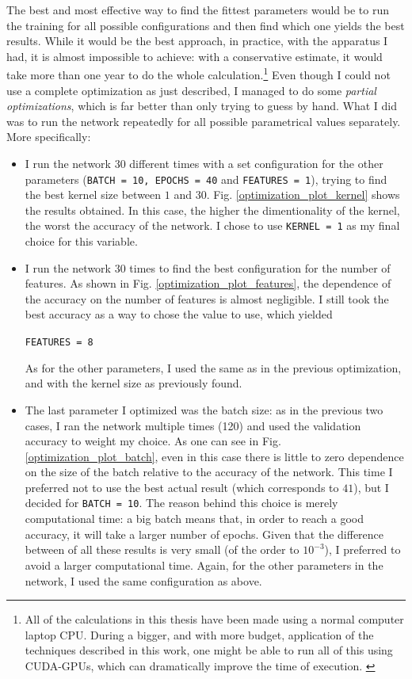 \documentclass[12pt,a4paper,final]{book}			%
\begin{document}
					The best and most effective way to find the fittest parameters would be to run the training for all possible configurations and then find which one yields the best results. While it would be the best approach, in practice, with the apparatus I had, it is almost impossible to achieve: with a conservative estimate, it would take more than one year to do the whole calculation.\footnote{All of the calculations in this thesis have been made using a normal computer laptop CPU. During a bigger, and with more budget, application of the techniques described in this work, one might be able to run all of this using CUDA-GPUs, which can dramatically improve the time of execution. \cite{cuda-gpu}}
					Even though I could not use a complete optimization as just described, I managed to do some \textit{partial optimizations}, which is far better than only trying to guess by hand. What I did was to run the network repeatedly for all possible parametrical values separately. More specifically:
					\begin{itemize}
						\item I run the network $30$ different times with a set configuration for the other parameters (\texttt{BATCH = 10, EPOCHS = 40} and \texttt{FEATURES = 1}), trying to find the best kernel size between $1$ and $30$. Fig. \ref{optimization_plot_kernel} shows the results obtained. In this case, the higher the dimentionality of the kernel, the worst the accuracy of the network. 
						I chose to use \texttt{KERNEL = 1} as my final choice for this variable.
						\item I run the network $30$ times to find the best configuration for the number of features. As shown in Fig. \ref{optimization_plot_features}, the dependence of the accuracy on the number of features is almost negligible. I still took the best accuracy as a way to chose the value to use, which yielded
						\begin{center}
							\texttt{FEATURES = 8}
						\end{center}
						As for the other parameters, I used the same as in the previous optimization, and with the kernel size as previously found.
						\item The last parameter I optimized was the batch size: as in the previous two cases, I ran the network multiple times (120) and used the validation accuracy to weight my choice. As one can see in Fig.  \ref{optimization_plot_batch}, even in this case there is little to zero dependence on the size of the batch relative to the accuracy of the network.  
						This time I preferred not to use the best actual result (which corresponds to $41$), but I decided for \texttt{BATCH = 10}. The reason behind this choice is merely computational time: a big batch means that, in order to reach a good accuracy, it will take a larger number of epochs. Given that the difference between of all these results is very small (of the order to $10^{-3}$), I preferred to avoid a larger computational time.
						Again, for the other parameters in the network, I used the same configuration as above.
					\end{itemize}
					
\end{document}

